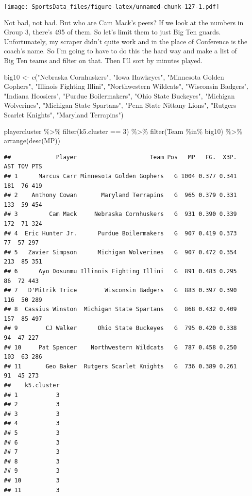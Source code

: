 \documentclass[
]{book}
\newenvironment{Shaded}{\begin{snugshade}}{\end{snugshade}}
\newcommand{\DecValTok}[1]{\textcolor[rgb]{0.00,0.00,0.81}{#1}}
\newcommand{\FunctionTok}[1]{\textcolor[rgb]{0.00,0.00,0.00}{#1}}
\newcommand{\NormalTok}[1]{#1}
\newcommand{\OtherTok}[1]{\textcolor[rgb]{0.56,0.35,0.01}{#1}}
\newcommand{\SpecialCharTok}[1]{\textcolor[rgb]{0.00,0.00,0.00}{#1}}
\newcommand{\StringTok}[1]{\textcolor[rgb]{0.31,0.60,0.02}{#1}}
\begin{document}
\texttt{[image: SportsData\_files/figure-latex/unnamed-chunk-127-1.pdf]}

Not bad, not bad. But who are Cam Mack's peers? If we look at the numbers in Group 3, there's 495 of them. So let's limit them to just Big Ten guards. Unfortunately, my scraper didn't quite work and in the place of Conference is the coach's name. So I'm going to have to do this the hard way and make a list of Big Ten teams and filter on that. Then I'll sort by minutes played.

\begin{Shaded}
\begin{Highlighting}[]
\NormalTok{big10 }\OtherTok{\textless{}{-}} \FunctionTok{c}\NormalTok{(}\StringTok{"Nebraska Cornhuskers"}\NormalTok{, }\StringTok{"Iowa Hawkeyes"}\NormalTok{, }\StringTok{"Minnesota Golden Gophers"}\NormalTok{, }\StringTok{"Illinois Fighting Illini"}\NormalTok{, }\StringTok{"Northwestern Wildcats"}\NormalTok{, }\StringTok{"Wisconsin Badgers"}\NormalTok{, }\StringTok{"Indiana Hoosiers"}\NormalTok{, }\StringTok{"Purdue Boilermakers"}\NormalTok{, }\StringTok{"Ohio State Buckeyes"}\NormalTok{, }\StringTok{"Michigan Wolverines"}\NormalTok{, }\StringTok{"Michigan State Spartans"}\NormalTok{, }\StringTok{"Penn State Nittany Lions"}\NormalTok{, }\StringTok{"Rutgers Scarlet Knights"}\NormalTok{, }\StringTok{"Maryland Terrapins"}\NormalTok{)}

\NormalTok{playercluster }\SpecialCharTok{\%\textgreater{}\%} \FunctionTok{filter}\NormalTok{(k5.cluster }\SpecialCharTok{==} \DecValTok{3}\NormalTok{) }\SpecialCharTok{\%\textgreater{}\%} \FunctionTok{filter}\NormalTok{(Team }\SpecialCharTok{\%in\%}\NormalTok{ big10) }\SpecialCharTok{\%\textgreater{}\%} \FunctionTok{arrange}\NormalTok{(}\FunctionTok{desc}\NormalTok{(MP))}
\end{Highlighting}
\end{Shaded}

\begin{verbatim}
##             Player                     Team Pos   MP   FG.  X3P. AST TOV PTS
## 1      Marcus Carr Minnesota Golden Gophers   G 1004 0.377 0.341 181  76 419
## 2    Anthony Cowan       Maryland Terrapins   G  965 0.379 0.331 133  59 454
## 3         Cam Mack     Nebraska Cornhuskers   G  931 0.390 0.339 172  71 324
## 4  Eric Hunter Jr.      Purdue Boilermakers   G  907 0.419 0.373  77  57 297
## 5   Zavier Simpson      Michigan Wolverines   G  907 0.472 0.354 213  85 351
## 6      Ayo Dosunmu Illinois Fighting Illini   G  891 0.483 0.295  86  72 443
## 7   D'Mitrik Trice        Wisconsin Badgers   G  883 0.397 0.390 116  50 289
## 8  Cassius Winston  Michigan State Spartans   G  868 0.432 0.409 157  85 497
## 9        CJ Walker      Ohio State Buckeyes   G  795 0.420 0.338  94  47 227
## 10     Pat Spencer    Northwestern Wildcats   G  787 0.458 0.250 103  63 286
## 11       Geo Baker  Rutgers Scarlet Knights   G  736 0.389 0.261  91  45 273
##    k5.cluster
## 1           3
## 2           3
## 3           3
## 4           3
## 5           3
## 6           3
## 7           3
## 8           3
## 9           3
## 10          3
## 11          3
\end{verbatim}
\end{document}
